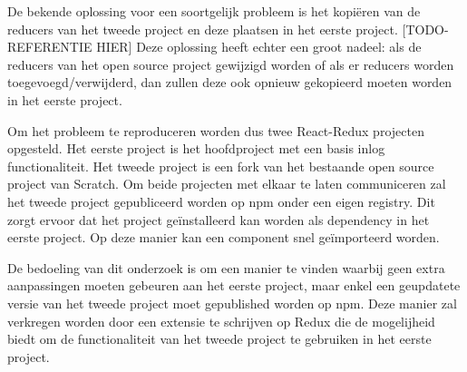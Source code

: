 De bekende oplossing voor een soortgelijk probleem is het kopiëren van de reducers van het tweede project en deze plaatsen in het eerste project. [TODO-REFERENTIE HIER]
Deze oplossing heeft echter een groot nadeel: als de reducers van het open source project gewijzigd worden of als er reducers worden toegevoegd/verwijderd, dan zullen deze ook opnieuw gekopieerd moeten worden in het eerste project. 

Om het probleem te reproduceren worden dus twee React-Redux projecten opgesteld. Het eerste project is het hoofdproject  met een basis inlog functionaliteit. Het tweede project is een fork van het bestaande open source project van Scratch. Om beide projecten met elkaar te laten communiceren zal het tweede project gepubliceerd worden op npm onder een eigen registry. Dit zorgt ervoor dat het project geïnstalleerd kan worden als dependency in het eerste project. Op deze manier kan een component snel geïmporteerd worden. 

De bedoeling van dit onderzoek is om een manier te vinden waarbij geen extra aanpassingen moeten gebeuren aan het eerste project, maar enkel een geupdatete versie van het tweede project moet gepublished worden op npm.
Deze manier zal verkregen worden door een extensie te schrijven op Redux die de mogelijheid biedt om de functionaliteit van het tweede project te gebruiken in het eerste project. 
